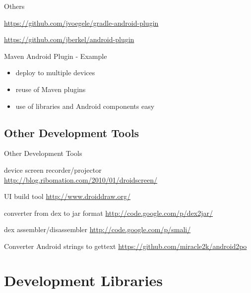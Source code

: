 \documentclass[aspectratio=169]{beamer}
\newcommand{\surl}[1] {{\tiny \url{#1}}}
\begin{document}
    \begin{frame}{Others}
      \begin{description}
       \item<1->[Gradle Android Plugin] \surl{https://github.com/jvoegele/gradle-android-plugin}
       \item<2->[SBT Android Plugin] \surl{https://github.com/jberkel/android-plugin}
      \end{description}
    \end{frame}

    \begin{frame}{Maven Android Plugin - Example}
      \begin{itemize}
       \item deploy to multiple devices
       \item reuse of Maven plugins
       \item use of libraries and Android components easy
      \end{itemize}
    \end{frame}



  \subsection{Other Development Tools}

    \begin{frame}{Other Development Tools}
      \begin{description}
        \item<1->[Droid at Screen] device screen recorder/projector \surl{http://blog.ribomation.com/2010/01/droidscreen/}

        \item<2->[DroidDraw] UI build tool \surl{http://www.droiddraw.org/}
 
        \item<3->[dex2jar] converter from dex to jar format \surl{http://code.google.com/p/dex2jar/}

        \item<4->[smali/baksmali] dex assembler/disassembler \surl{http://code.google.com/p/smali/}

        \item<5->[Android2PO] Converter Android strings to gettext \surl{https://github.com/miracle2k/android2po}
      \end{description}
   \end{frame}

\section{Development Libraries}
\end{document}
